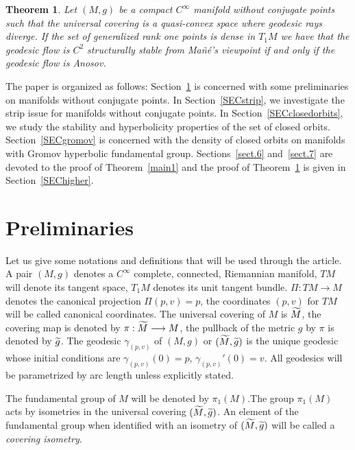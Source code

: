 \documentclass[10pt]{amsart}
\newtheorem{theo}[cdrthm]{Theorem}
\theoremstyle{definition}
\let\oldtilde\tilde
\renewcommand*{\tilde}[1]{\mathchoice{\widetilde{#1}}{\widetilde{#1}}{\oldtilde{#1}}{\oldtilde{#1}}}
\begin{document}
\begin{theo}\label{main2}
Let $(M,g)$ be a compact $C^{\infty}$ manifold without conjugate points such that the universal covering is a quasi-convex space where geodesic rays diverge. If the set of generalized rank one points is dense in $T_{1}M$ we have that the geodesic flow is $C^{2}$ structurally stable from Mañé's viewpoint if and only if the geodesic flow is Anosov.
\end{theo}


The paper is organized as follows: Section~\ref{SECpreliminaries} is concerned with some preliminaries on manifolds without conjugate points. In Section~\ref{SECstrip}, we investigate the strip issue for manifolds without conjugate points. In Section~\ref{SECclosedorbits}, we study the stability and hyperbolicity properties of the set of closed orbits. Section~\ref{SECgromov} is concerned with the density of closed orbits on manifolds with Gromov hyperbolic fundamental group. Sections~\ref{sect.6} and~\ref{sect.7} are devoted to the proof of Theorem~\ref{main1} and the proof of Theorem~\ref{main2} is given in Section~\ref{SEChigher}.

\section{Preliminaries}\label{SECpreliminaries}

Let us give some notations and definitions that will be used through the article. A pair $(M,g)$ denotes a $C^{\infty}$ complete, connected, Riemannian manifold, $TM$ will denote its tangent space, $T_{1}M$ denotes its unit tangent bundle. $\Pi: TM \longrightarrow M$ denotes the canonical projection $\Pi(p,v) = p$, the coordinates $(p,v)$ for $TM$ will be called canonical coordinates. The universal covering of $M$ is $\tilde{M}$, the covering map is denoted by $\pi:\tilde{M} \longrightarrow M$, the pullback of the metric $g$ by $\pi$ is denoted by $\tilde{g}$. The geodesic $\gamma_{(p,v)}$ of $(M,g)$ or $(\tilde{M},\tilde{g})$ is the unique geodesic whose initial conditions are $\gamma_{(p,v)}(0)=p$, $\gamma_{(p,v)}'(0)= v$. All geodesics will be parametrized by arc length unless explicitly stated.

The fundamental group of $M$ will be denoted by $\pi_{1}(M)$.The group $\pi_{1}(M)$ acts by isometries in the universal covering $(\tilde{M}, \tilde{g})$. An element of the fundamental group when identified with an isometry of $(\tilde{M}, \tilde{g})$ will be called a \emph{covering isometry}.
\end{document}

